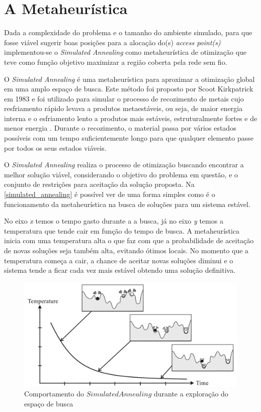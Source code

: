 \documentclass[
	12pt,				%
	twoside,			%
	a4paper,			%
	english,			%
	french,				%
	spanish,			%
	brazil				%
	]{abntex2}
\begin{document}
\section{A Metaheurística}\label{a-metaheuruxedstica}

Dada a complexidade do problema e o tamanho do ambiente simulado, para
que fosse viável sugerir boas posições para a alocação do(s)
\emph{access point(s)} implementou-se o \emph{Simulated Annealing} como
metaheurística de otimização que teve como função objetivo maximizar a
região coberta pela rede sem fio.

O \emph{Simulated Annealing} é uma metaheurística para aproximar a
otimização global em uma amplo espaço de busca. Este método foi proposto
por Scoot Kirkpatrick em 1983 e foi utilizado para simular o processo de
recozimento de metais cujo resfriamento rápido levava a produtos
metaestáveis, ou seja, de maior energia interna e o esfriamento lento a
produtos mais estáveis, estruturalmente fortes e de menor energia
\cite{VAN}. Durante o recozimento, o material passa por vários estados
possíveis com um tempo suficientemente longo para que qualquer elemento
passe por todos os seus estados viáveis.

O \emph{Simulated Annealing} realiza o processo de otimização buscando
encontrar a melhor solução viável, considerando o objetivo do problema
em questão, e o conjunto de restrições para aceitação da solução
proposta. Na \autoref{simulated_annealing} é possível ver de uma forma
simples como é o funcionamento da metaheurística na busca de soluções
para um sistema estável.

No eixo \emph{x} temos o tempo gasto durante a a busca, já no eixo
\emph{y} temos a temperatura que tende cair em função do tempo de busca.
A metaheurística inicia com uma temperatura alta o que faz com que a
probabilidade de aceitação de novas soluções seja também alta, evitando
ótimos locais. No momento que a temperatura começa a cair, a chance de
aceitar novas soluções diminui e o sistema tende a ficar cada vez mais
estável obtendo uma solução definitiva.

\begin{figure}[htb]
    \caption{\label{simulated_annealing} Comportamento do $Simulated Annealing$ durante a exploração do espaço de busca}
    \begin{center}
        \includegraphics[scale=0.185]{imagens/simulated-annealing.png}
    \end{center}
\end{figure}
\end{document}
